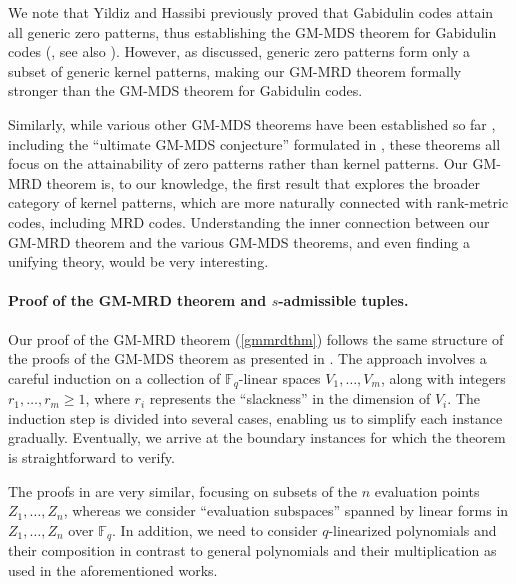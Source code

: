 \documentclass[11pt]{article}
\newif\ifmynotes
\newcommand{\ZZnote}[1]{\ifmynotes\textcolor{violet}{[Zihan: #1]}\else\fi}
\theoremstyle{plain}
\theoremstyle{definition}
\theoremstyle{remark}
\newcommand{\F}{\mathbb{F}}
\begin{document}

We note that Yildiz and Hassibi previously proved that Gabidulin codes attain all generic zero patterns, thus establishing the GM-MDS theorem for Gabidulin codes (\cite{yildiz2019gabidulin}, see also \cite{yildiz2020support}). However, as discussed, generic zero patterns form only a subset of generic kernel patterns, making our GM-MRD theorem formally stronger than the GM-MDS theorem for Gabidulin codes.

Similarly, while various other GM-MDS theorems have been established so far \cite{lovett2018mds,yildiz2019optimum,brakensiek2023generalized,ron2024efficient}, including the ``ultimate GM-MDS conjecture'' formulated in \cite{brakensiek2023generalized}, these theorems all focus on the attainability of zero patterns rather than kernel patterns. Our GM-MRD theorem is, to our knowledge, the first result that explores the broader category of kernel patterns, which are more naturally connected with rank-metric codes, including MRD codes. Understanding the inner connection between our GM-MRD theorem and the various GM-MDS theorems, and even finding a unifying theory, would be very interesting.

\paragraph{Proof of the GM-MRD theorem and $s$-admissible tuples.}

Our proof of the GM-MRD theorem (\cref{gmmrdthm}) follows the same structure of the proofs of the GM-MDS theorem as presented in \cite{lovett2018mds, yildiz2019optimum}.
The approach involves a careful induction on a collection of $\F_q$-linear spaces $V_1,\dots,V_m$, along with integers $r_1,\dots,r_m\geq 1$, where $r_i$ represents the ``slackness'' in the dimension of $V_i$. The induction step is divided into several cases, enabling us to simplify each instance gradually. Eventually, we arrive at the boundary instances for which the theorem is straightforward to verify.

The proofs in \cite{lovett2018mds, yildiz2019optimum} are very similar, focusing on subsets of the $n$ evaluation points $Z_1,\dots,Z_n$, whereas we consider ``evaluation subspaces'' spanned by linear forms in $Z_1,\dots,Z_n$ over $\F_q$.
In addition, we need to consider $q$-linearized polynomials and their composition in contrast to general polynomials and their multiplication as used in the aforementioned works.
\end{document}
